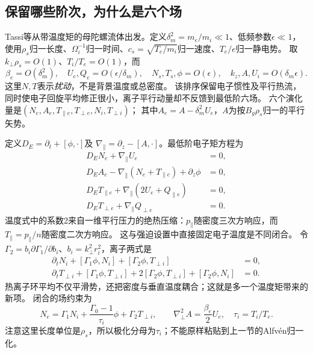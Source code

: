 \documentclass[UTF8,a4paper,11pt,openany,fontset=fandol]{ctexbook}
\begin{document}
\subsection{保留哪些阶次，为什么是六个场}
Tassi等从带温度矩的母陀螺流体出发。定义$\delta_m^2=m_e/m_i\ll1$、低频参数$\epsilon\ll1$，
使用$\rho_s$归一长度、$\Omega_i^{-1}$归一时间、$c_s=\sqrt{T_e/m_i}$归一速度、$T_e/e$归一静电势。
取$k_\perp\rho_s=O(1)$、$T_i/T_e=O(1)$，而
\begin{equation}
 \beta_e=O(\delta_m^2),\quad
 U_e,Q_e=O(\epsilon/\delta_m),\quad
 N_s,T_s,\phi=O(\epsilon),\quad
 k_z,A,U_i=O(\delta_m\epsilon).
\end{equation}
这里$N,T$表示\emph{扰动}，不是背景温度或总密度。
该排序保留电子惯性及平行热流，同时使电子回旋平均修正很小，离子平行动量却不反馈到最低阶六场。
六个演化量是$(N_e,A_e,T_{\parallel e},T_{\perp e},N_i,T_{\perp i})$；
其中$A_e=A-\delta_m^2U_e$，$A$为按$B_g\rho_s$归一的平行矢势。\citep{L244}

定义$D_E=\partial_t+[\phi,\cdot]$及
$\nabla_\parallel=\partial_z-[A,\cdot]$。最低阶电子矩方程为
\begin{align}
 D_EN_e+\nabla_\parallel U_e&=0,\\
 D_EA_e-\nabla_\parallel(N_e+T_{\parallel e})+\partial_z\phi&=0,\\
 D_ET_{\parallel e}+\nabla_\parallel(2U_e+Q_{\parallel e})&=0,\\
 D_ET_{\perp e}+\nabla_\parallel Q_{\perp e}&=0.
 \label{eq:landau_e}
\end{align}
温度式中的系数2来自一维平行压力的绝热压缩：$p_\parallel$随密度三次方响应，而$T_\parallel=p_\parallel/n$随密度二次方响应。
这与强迫设置中直接固定电子温度是不同闭合。
令$\Gamma_2=b_i\partial\Gamma_1/\partial b_i$、$b_i=k_\perp^2r_i^2$，离子两式是
\begin{align}
 \partial_tN_i+[\Gamma_1\phi,N_i]+[\Gamma_2\phi,T_{\perp i}]&=0,\\
 \partial_tT_{\perp i}+[\Gamma_1\phi,T_{\perp i}]
 +2[\Gamma_2\phi,T_{\perp i}]+[\Gamma_2\phi,N_i]&=0.
\end{align}
热离子环平均不仅平滑势，还把密度与垂直温度耦合；这就是多一个温度矩带来的新项。
闭合的场约束为
\begin{equation}
 N_e=\Gamma_1N_i+\frac{\Gamma_0-1}{\tau_i}\phi
           +\Gamma_2T_{\perp i},\qquad
 \nabla_\perp^2A=\frac{\beta_e}{2}U_e,\quad\tau_i=T_i/T_e.
\end{equation}
注意这里长度单位是$\rho_s$，所以极化分母为$\tau_i$；不能原样粘贴到上一节的Alfvén归一化。
\end{document}
